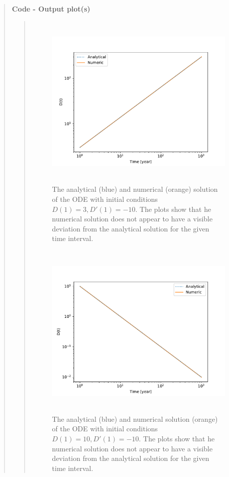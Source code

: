 \begin{quote}
\begin{quote}
\centering

\end{quote}

\newpage

\textbf{Code - Output plot(s)}
\begin{quote}
\begin{figure}[!ht]
\centering
\includegraphics[width=14cm, height=8.5cm]{./Plots/3_ode_0.pdf}
\caption{The analytical (blue) and numerical (orange) solution of the ODE with initial conditions $D(1) = 3, D'(1) = -10$. The plots show that he numerical solution does not appear to have a visible deviation from the analytical solution for the given time interval.}
\end{figure}

\begin{figure}[!ht]
\centering
\includegraphics[width=14cm, height=8.5cm]{./Plots/3_ode_1.pdf}
\caption{The analytical (blue) and numerical solution (orange) of the ODE with initial conditions $D(1) = 10,  D'(1) = -10$. The plots show that he numerical solution does not appear to have a visible deviation from the analytical solution for the given time interval.}
\end{figure}
\newpage



\end{quote}
\end{quote}
